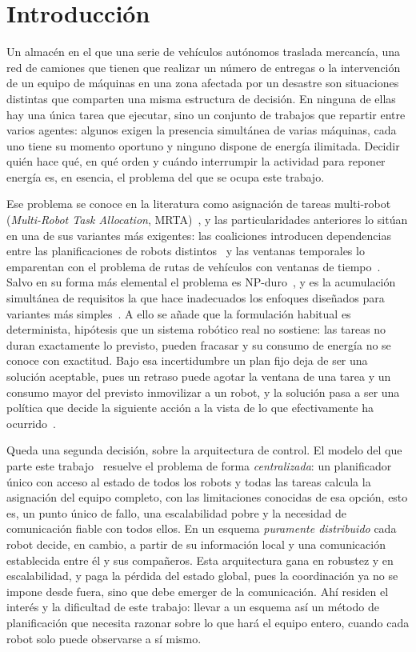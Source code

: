 \chapter{Introducción}\label{cap:introduccion}

Un almacén en el que una serie de vehículos autónomos traslada mercancía, una red de camiones que tienen que realizar un número de entregas o la intervención de un equipo de máquinas en una zona afectada por un desastre son situaciones distintas que comparten una misma estructura de decisión. En ninguna de ellas hay una única tarea que ejecutar, sino un conjunto de trabajos que repartir entre varios agentes: algunos exigen la presencia simultánea de varias máquinas, cada uno tiene su momento oportuno y ninguno dispone de energía ilimitada. Decidir quién hace qué, en qué orden y cuándo interrumpir la actividad para reponer energía es, en esencia, el problema del que se ocupa este trabajo.

Ese problema se conoce en la literatura como asignación de tareas multi-robot (\textit{Multi-Robot Task Allocation}, MRTA)~\cite{gerkey2004taxonomy}, y las particularidades anteriores lo sitúan en una de sus variantes más exigentes: las coaliciones introducen dependencias entre las planificaciones de robots distintos~\cite{korsah2013taxonomy} y las ventanas temporales lo emparentan con el problema de rutas de vehículos con ventanas de tiempo~\cite{tothvigo2014vehicle}. Salvo en su forma más elemental el problema es NP-duro~\cite{gerkey2004taxonomy}, y es la acumulación simultánea de requisitos la que hace inadecuados los enfoques diseñados para variantes más simples~\cite{khamis2015survey}. A ello se añade que la formulación habitual es determinista, hipótesis que un sistema robótico real no sostiene: las tareas no duran exactamente lo previsto, pueden fracasar y su consumo de energía no se conoce con exactitud. Bajo esa incertidumbre un plan fijo deja de ser una solución aceptable, pues un retraso puede agotar la ventana de una tarea y un consumo mayor del previsto inmovilizar a un robot, y la solución pasa a ser una política que decide la siguiente acción a la vista de lo que efectivamente ha ocurrido~\cite{choudhury2020dynamic}.

Queda una segunda decisión, sobre la arquitectura de control. El modelo del que parte este trabajo~ resuelve el problema de forma \emph{centralizada}: un planificador único con acceso al estado de todos los robots y todas las tareas calcula la asignación del equipo completo, con las limitaciones conocidas de esa opción, esto es, un punto único de fallo, una escalabilidad pobre y la necesidad de comunicación fiable con todos ellos. En un esquema \emph{puramente distribuido} cada robot decide, en cambio, a partir de su información local y una comunicación establecida entre él y sus compañeros. Esta arquitectura gana en robustez y en escalabilidad, y paga la pérdida del estado global, pues la coordinación ya no se impone desde fuera, sino que debe emerger de la comunicación. Ahí residen el interés y la dificultad de este trabajo: llevar a un esquema así un método de planificación que necesita razonar sobre lo que hará el equipo entero, cuando cada robot solo puede observarse a sí mismo.

